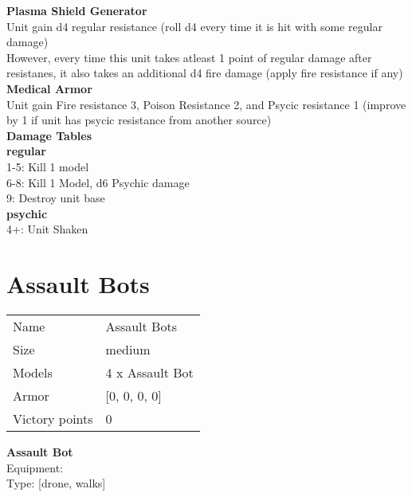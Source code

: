 {\bf Plasma Shield Generator } \\

Unit gain d4 regular resistance (roll d4 every time it is hit with some regular damage)\\ 
However, every time this unit takes atleast 1 point of regular damage after resistanes, it also takes an additional d4 fire damage (apply fire resistance if any)\\ 





{\bf Medical Armor } \\

Unit gain Fire resistance 3, Poison Resistance 2, and Psycic resistance 1 (improve by 1 if unit has psycic resistance from another source)\\ 





 





{\bf Damage Tables} \\
 {\bf regular } \\
1-5: Kill 1 model \\
6-8: Kill 1 Model, d6 Psychic damage \\
9: Destroy unit base \\
 {\bf psychic } \\
4+: Unit Shaken \\










\pagebreak\pagebreak

\section{ Assault Bots }

\begin{tabular}{ll}
  Name & Assault Bots \\
  Size & medium\\
  Models & 4 x Assault Bot\\
  Armor & [0, 0, 0, 0]\\
  Victory points & 0\\
\end{tabular}

{\bf Assault Bot } \\
Equipment:  \\
Type: [drone, walks] \\

